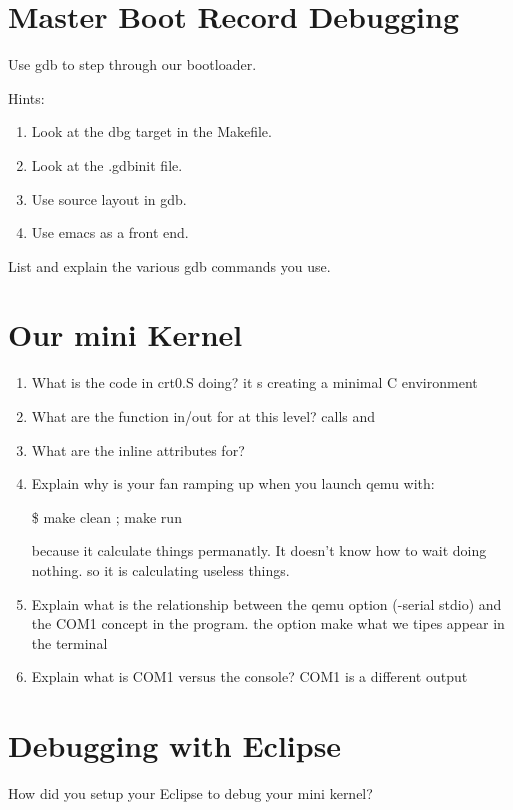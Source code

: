 \documentclass[10]{article}
\begin{document}
\section{Master Boot Record Debugging}

Use gdb to step through our bootloader.

Hints: 
\begin{enumerate}
\item 
Look at the dbg target in the Makefile.
\item
Look at the .gdbinit file.
\item
Use source layout in gdb.
\item
Use emacs as a front end.
\end{enumerate}

List and explain the various gdb commands you use.

\section{Our mini Kernel}

\begin{enumerate}
\item
What is the code in crt0.S doing?
it s creating a minimal C environment
\item
What are the function in/out for at this level?
calls and 
\item
What are the inline attributes for?

\item
Explain why is your fan ramping up when you launch qemu with:

  \$ make clean ; make run

because it calculate things permanatly. It doesn't know how to wait doing nothing. so it is calculating useless things.

\item
Explain what is the relationship between the qemu option (-serial stdio)
and the COM1 concept in the program.
the option make what we tipes appear in the terminal
\item
Explain what is COM1 versus the console?
COM1 is a different output
\end{enumerate}

\section{Debugging with Eclipse}

How did you setup your Eclipse to debug your mini kernel?
\end{document}
